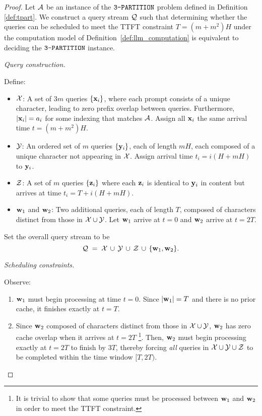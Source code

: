 \begin{proof}
Let $\mathcal{A}$ be an instance of the $\texttt{3-PARTITION}$ problem defined in Definition \ref{def:tpart}. We construct a query stream $\mathcal{Q}$ such that determining whether the queries can be scheduled to meet the TTFT constraint $T = (m + m^2)H$ under the computation model of Definition~\ref{def:llm_computation} is equivalent to deciding the $\texttt{3-PARTITION}$ instance.

\emph{Query construction.} 

Define:
\begin{itemize}
    \item $\mathcal{X}$: A set of $3m$ queries $\{\mathbf{x}_i\}$, where each prompt consists of a unique character, leading to zero prefix overlap between queries. Furthermore, $|\mathbf{x}_i| = a_i$ for some indexing that matches $\mathcal{A}$. Assign all $\mathbf{x}_i$ the same arrival time $t = (m + m^2)H$.
    \item $\mathcal{Y}$: An ordered set of $m$ queries $\{\mathbf{y}_i\}$, each of length $mH$, each composed of a unique character not appearing in $\mathcal{X}$. Assign arrival time $t_i = i(H + mH)$ to $\mathbf{y}_i$.
    \item $\mathcal{Z}$: A set of $m$ queries $\{\mathbf{z}_i\}$ where each $\mathbf{z}_i$ is identical to $\mathbf{y}_i$ in content but arrives at time $t_i = T + i(H + mH)$.
    \item $\mathbf{w}_1$ and $\mathbf{w}_2$: Two additional queries, each of length $T$, composed of characters distinct from those in $\mathcal{X} \cup \mathcal{Y}$. Let $\mathbf{w}_1$ arrive at $t = 0$ and $\mathbf{w}_2$ arrive at $t = 2T$. 
\end{itemize}
Set the overall query stream to be
\[
\mathcal{Q} \;=\; \mathcal{X} \,\cup\, \mathcal{Y} \,\cup\, \mathcal{Z} \,\cup\, \{\mathbf{w}_1,\mathbf{w}_2\}.
\]

\emph{Scheduling constraints.} 

Observe:
\begin{enumerate}
    \item $\mathbf{w}_1$ must begin processing at time $t=0$. Since $|\mathbf{w}_1|=T$ and there is no prior cache, it finishes exactly at $t=T$.
    \item Since $\mathbf{w}_2$ composed of characters distinct from those in $\mathcal{X} \cup \mathcal{Y}$, $\mathbf{w}_2$ has zero cache overlap when it arrives at $t=2T$ \footnote{It is trivial to show that some queries must be processed between $\mathbf{w}_1$ and $\mathbf{w}_2$ in order to meet the TTFT constraint.}. Then, $\mathbf{w}_2$ must begin processing exactly at $t=2T$ to finish by $3T$, thereby forcing \emph{all} queries in $\mathcal{X} \cup \mathcal{Y} \cup \mathcal{Z}$ to be completed within the time window $[T, 2T)$.
\end{enumerate}


\end{proof}
